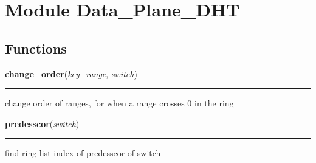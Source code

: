 %
%
%


\section{Module Data\_Plane\_DHT}

    \label{Data_Plane_DHT}


  \subsection{Functions}

    \label{Data_Plane_DHT:change_order}

    \vspace{0.5ex}

\hspace{.8\funcindent}\begin{boxedminipage}{\funcwidth}

    \raggedright \textbf{change\_order}(\textit{key\_range}, \textit{switch})

    \vspace{-1.5ex}

    \rule{\textwidth}{0.5\fboxrule}
\setlength{\parskip}{2ex}
    change order of ranges, for when a range crosses 0 in the ring

\setlength{\parskip}{1ex}
    \end{boxedminipage}

    \label{Data_Plane_DHT:predesscor}

    \vspace{0.5ex}

\hspace{.8\funcindent}\begin{boxedminipage}{\funcwidth}

    \raggedright \textbf{predesscor}(\textit{switch})

    \vspace{-1.5ex}

    \rule{\textwidth}{0.5\fboxrule}
\setlength{\parskip}{2ex}
    find ring list index of predesscor of switch

\setlength{\parskip}{1ex}
    \end{boxedminipage}


